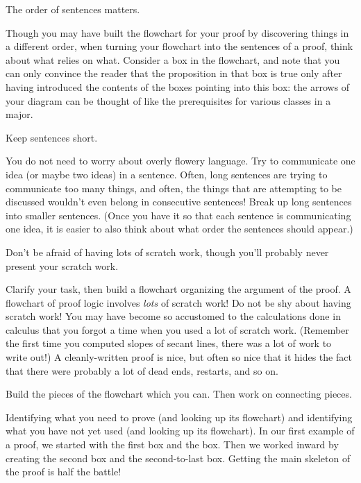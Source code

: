 \documentclass{book}
\theoremstyle{ekimcustom}
\begin{document}
\begin{bhabit}{}{}
The order of sentences matters.
\end{bhabit}
Though you may have built the flowchart for your proof by discovering things in a different order, when turning your flowchart into the sentences of a proof, think about what relies on what. Consider a box in the flowchart, and note that you can only convince the reader that the proposition in that box is true only after having introduced the contents of the boxes pointing into this box: the arrows of your diagram can be thought of like the prerequisites for various classes in a major.


\begin{bhabit}{}{}
Keep sentences short.
\end{bhabit}
You do not need to worry about overly flowery language. Try to communicate one idea (or maybe two ideas) in a sentence. Often, long sentences are trying to communicate too many things, and often, the things that are attempting to be discussed wouldn't even belong in consecutive sentences! Break up long sentences into smaller sentences. (Once you have it so that each sentence is communicating one idea, it is easier to also think about what order the sentences should appear.)


\begin{bhabit}{}{}
Don't be afraid of having lots of scratch work, though you'll probably never present your scratch work.
\end{bhabit}
Clarify your task, then build a flowchart organizing the argument of the proof. A flowchart of proof logic involves \emph{lots} of scratch work! Do not be shy about having scratch work! You may have become so accustomed to the calculations done in calculus that you forgot a time when you used a lot of scratch work. (Remember the first time you computed slopes of secant lines, there was a lot of work to write out!) A cleanly-written proof is nice, but often so nice that it hides the fact that there were probably a lot of dead ends, restarts, and so on.


\begin{bhabit}{}{}
Build the pieces of the flowchart which you can. Then work on connecting pieces.
\end{bhabit}
Identifying what you need to prove (and looking up its flowchart) and identifying what you have not yet used (and looking up its flowchart). In our first example of a proof, we started with the first box and the box. Then we worked inward by creating the second box and the second-to-last box. Getting the main skeleton of the proof is half the battle!
\end{document}
